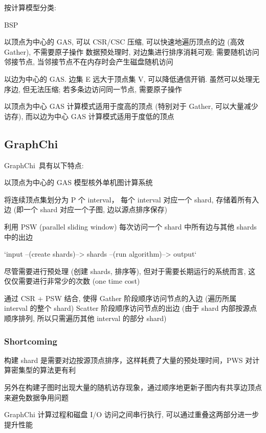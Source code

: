 \documentclass[UTF8,12pt,a4paper]{article}
\begin{document}
按计算模型分类:
\begin{compactitem}
  \item BSP
  \item 以顶点为中心的 GAS, 可以 CSR/CSC 压缩, 可以快速地遍历顶点的边 (高效 Gather), 不需要原子操作
  数据预处理时, 对边集进行排序消耗可观; 
  需要随机访问邻接节点, 当邻接节点不在内存时会产生磁盘随机访问
  \item 以边为中心的 GAS. 边集 E 远大于顶点集 V, 可以降低通信开销.
  虽然可以处理无序边, 但无法压缩;
  若多条边访问同一节点, 需要原子操作
  \item 以顶点为中心 GAS 计算模式适用于度高的顶点 (特别对于 Gather, 可以大量减少访存),
  而以边为中心 GAS 计算模式适用于度低的顶点
\end{compactitem}


\subsection{GraphChi}
GraphChi~\cite{DBLP:conf/osdi/KyrolaBG12}具有以下特点:
\begin{compactitem}
  \item 以顶点为中心的 GAS 模型核外单机图计算系统
  \item 将连续顶点集划分为 P 个 interval， 每个 interval 对应一个 shard,
  存储着所有入边 (即一个 shard 对应一个子图, 边以源点排序保存)
  \item 利用 PSW (parallel sliding window) 每次访问一个 shard 中所有边与其他 shards 中的出边
  \item `input --(create shards)--> shards --(run algorithm)--> output`
  \item 尽管需要进行预处理 (创建 shards, 排序等), 但对于需要长期运行的系统而言, 这仅仅需要进行非常少的次数 (one time cost)
  \item 通过 CSR + PSW 结合, 使得 Gather 阶段顺序访问节点的入边 (遍历所属 interval 的整个 shard)
  Scatter 阶段顺序访问节点的出边 (由于 shard 内部按源点顺序排列, 所以只需遍历其他 interval 的部分 shard)
\end{compactitem}
\subsubsection{Shortcoming}
\begin{compactitem}
  \item 构建 shard 是需要对边按源顶点排序，这样耗费了大量的预处理时间，PWS 对计算密集型的算法更有利
  \item 另外在构建子图时出现大量的随机访存现象，通过顺序地更新子图内有共享边顶点来避免数据争用问题
  \item GraphChi 计算过程和磁盘 I/O 访问之间串行执行, 可以通过重叠这两部分进一步提升性能
\end{compactitem}
\end{document}
